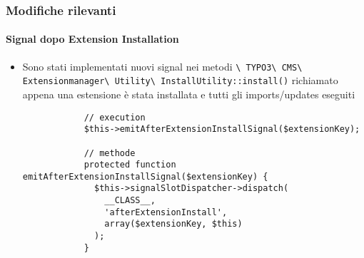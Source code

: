 \begin{frame}[fragile]
	\frametitle{Modifiche rilevanti}
	\framesubtitle{Signal dopo Extension Installation}

	\lstset{basicstyle=\tiny\ttfamily}

	\begin{itemize}

		\item Sono stati implementati nuovi signal nei metodi
			\smaller
				\texttt{\textbackslash
					TYPO3\textbackslash
					CMS\textbackslash
					Extensionmanager\textbackslash
					Utility\textbackslash
					InstallUtility::install()}
			\normalsize
			richiamato appena una estensione è stata installata e tutti gli imports/updates
			eseguiti

		\begin{lstlisting}
			// execution
			$this->emitAfterExtensionInstallSignal($extensionKey);

			// methode
			protected function emitAfterExtensionInstallSignal($extensionKey) {
			  $this->signalSlotDispatcher->dispatch(
			    __CLASS__,
			    'afterExtensionInstall',
			    array($extensionKey, $this)
			  );
			}
		\end{lstlisting}

	\end{itemize}

\end{frame}

